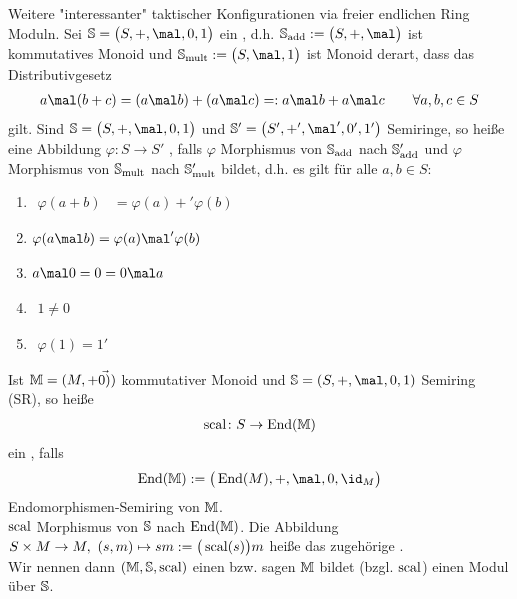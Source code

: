 \begin{beispiel}
	Weitere "interessanter" taktischer Konfigurationen via freier endlichen Ring Moduln.\nl
	Sei $\S=\big(S,+,\mal,0,1\big)$ ein , d.h. $\S_{\add}:=\big(S,+,\mal\big)$ ist kommutatives Monoid und $\S_{\mult}:=\big(S,\mal,1\big)$ ist Monoid derart, dass das Distributivgesetz
	\begin{align*}
		a\mal(b+c)=(a\mal b)+(a\mal c)=:a\mal b+a\mal c\qquad\forall a,b,c\in S
	\end{align*}
	gilt.
	Sind $\S=\big(S,+,\mal,0,1\big)$ und $\S'=\big(S',+',\mal',0',1'\big)$ Semiringe, so heiße eine Abbildung $\varphi\colon S\to S'$ , falls $\varphi$ Morphismus von $\S_{\add}$ nach $\S'_{\add}$ und $\varphi$ Morphismus von $\S_{\mult}$ nach $\S_{\mult}'$ bildet, d.h. es gilt für alle $a,b\in S$:
	\begin{enumerate}
		\item $\begin{aligned}
			\varphi(a+b)&=\varphi(a)+'\varphi(b)
		\end{aligned}$
		\item $\begin{aligned}
			\varphi(a\mal b)=\varphi(a)\mal'\varphi(b)
		\end{aligned}$
		\item $\begin{aligned}
			a\mal 0=0=0\mal a
		\end{aligned}$
		\item $\begin{aligned}
			1\neq 0
		\end{aligned}$
		\item $\begin{aligned}
			\varphi(1)=1'
		\end{aligned}$
	\end{enumerate}
	
	Ist $\M=(M,+\vec{0)})$ kommutativer Monoid und $\S=(S,+,\mal,0,1)$ Semiring (SR), so heiße 
	\begin{align*}
		\scal\colon S\to\End(\M)
	\end{align*}
	ein , falls
	\begin{align*}
		\End(\M):=\big(\End(M),+,\mal,0,\id_M\big)
	\end{align*}
	Endomorphismen-Semiring von $\M$.\\
	$\scal$ Morphismus von $\S$ nach $\End(\M)$.\nl
	Die Abbildung $S\times M\to M,~(s,m)\mapsto sm:=\big(\scal(s)\big)m$
	heiße das zugehörige .
	\\
	Wir nennen dann $(\M,\S,\scal)$ einen  bzw. sagen $\M$ bildet (bzgl. $\scal$) einen Modul über $\S$.
\end{beispiel}

